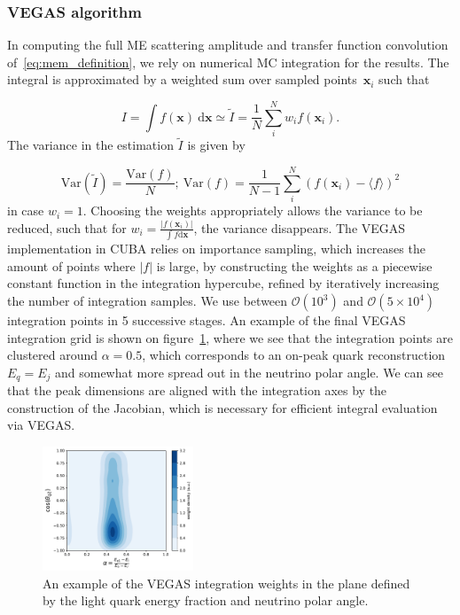 \subsubsection{VEGAS algorithm}
In computing the full ME scattering amplitude and transfer function convolution of~\cref{eq:mem_definition}, we rely on numerical MC integration for the results. The integral is approximated by a weighted sum over sampled points~$\mathbf{x}_i$ such that

\begin{equation}
I = \int f(\mathbf{x})\ \mathrm{d}\mathbf{x} \simeq \tilde{I} = \frac{1}{N} \sum_{i}^N w_i f(\mathbf{x}_i).
\end{equation}
The variance in the estimation $\tilde{I}$ is given by

$$\mathrm{Var}(\tilde{I}) = \frac{\mathrm{Var}(f)}{N};\ \mathrm{Var}(f) = \frac{1}{N-1} \sum_i^N(f(\mathbf{x}_i) - \langle f \rangle)^2$$
in case $w_i = 1$. Choosing the weights appropriately allows the variance to be reduced, such that for $w_i = \frac{|f(\mathbf{x}_i)|}{\int f \mathrm{d}\mathbf{x}}$, the variance disappears. The VEGAS implementation in CUBA relies on importance sampling, which increases the amount of points where $|f|$ is large, by constructing the weights as a piecewise constant function in the integration hypercube, refined by iteratively increasing the number of integration samples. We use between $\mathcal{O}(10^3)$ and $\mathcal{O}(5 \times 10^4)$ integration points in 5 successive stages. An example of the final VEGAS integration grid is shown on figure~\cref{fig:vegas_grid}, where we see that the integration points are clustered around $\alpha=0.5$, which corresponds to an on-peak quark reconstruction $E_q = E_j$ and somewhat more spread out in the neutrino polar angle. We can see that the peak dimensions are aligned with the integration axes by the construction of the Jacobian, which is necessary for efficient integral evaluation via VEGAS.

\begin{figure}[ht]
\begin{centering}
\includegraphics[width = 0.4\textwidth]{figures/mem/vegas_grid.pdf}
\caption[VEGAS grid example]{An example of the VEGAS integration weights in the plane defined by the light quark energy fraction and neutrino polar angle.}
\label{fig:vegas_grid}
\end{centering}
\end{figure}

